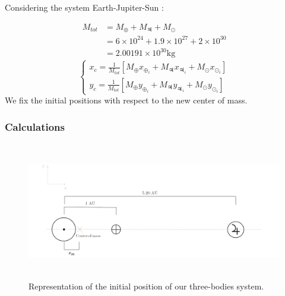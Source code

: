\documentclass[a4paper, twoside, 11pt]{report}
\theoremstyle{theorem}
\theoremstyle{remark}
\theoremstyle{exemple}
\begin{document}
            Considering the system Earth-Jupiter-Sun :
            
                \begin{align*}
                    M_{tot} &= M_{\oplus} + M_{\jupiter} + M_{\odot} \\
                    &= 6\times10^{24} + 1.9\times 10^{27} + 2 \times 10^{30}\\
                    &= 2.00191 \times 10^{30} \mathrm{kg}
                \end{align*}
                \begin{equation*}
                    \left\{
                        \begin{aligned}
                            x_c = \frac{1}{M_{tot}} [M_{\oplus} x_{\oplus_i} + M_{\jupiter} x_{\jupiter_i} + M_{\odot} x_{\odot_i}] \\
                            y_c = \frac{1}{M_{tot}} [M_{\oplus} y_{\oplus_i} + M_{\jupiter} y_{\jupiter_i} + M_{\odot} y_{\odot_i}]
                        \end{aligned}
                    \right.
                \end{equation*} 
            We fix the initial positions with respect to the new center of mass.
            
            \subsubsection{Calculations}
            
                \begin{center}
                \begin{figure}[h!]
                    \includegraphics[width=16cm,height=6cm]{dessinplanete.png}
                    \caption{Representation of the initial position of our three-bodies system.}
                \end{figure}
                \end{center}
                
\end{document}

